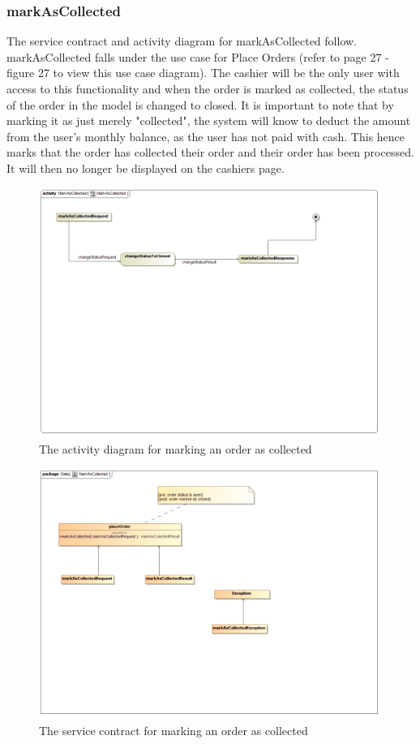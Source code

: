 \documentclass[a4paper,12pt]{report}
\begin{document}
\subsubsection{markAsCollected}
The service contract and activity diagram for markAsCollected follow. markAsCollected falls under the use case for Place Orders (refer to page 27 - figure 27 to view this use case diagram). The cashier will be the only user with access to this functionality and when the order is marked as collected, the status of the order in the model is changed to closed. It is important to note that by marking it as just merely "collected", the system will know to deduct the amount from the user's monthly balance, as the user has not paid with cash. This hence marks that the order has collected their order and their order has been processed. It will then no longer be displayed on the cashiers page.
\begin{figure}[H]
  \centering
    \includegraphics[width=1.0\textwidth]{../images/MarkAsCollectedActivity.png}
    \caption{The activity diagram for marking an order as collected } 
\end{figure}
 
\begin{figure}[H]
	\centering
	\includegraphics[width=1.0\textwidth]{../images/MarkAsCollectedSC.png}
	\caption{The service contract for marking an order as collected}
\end{figure}
\end{document}
